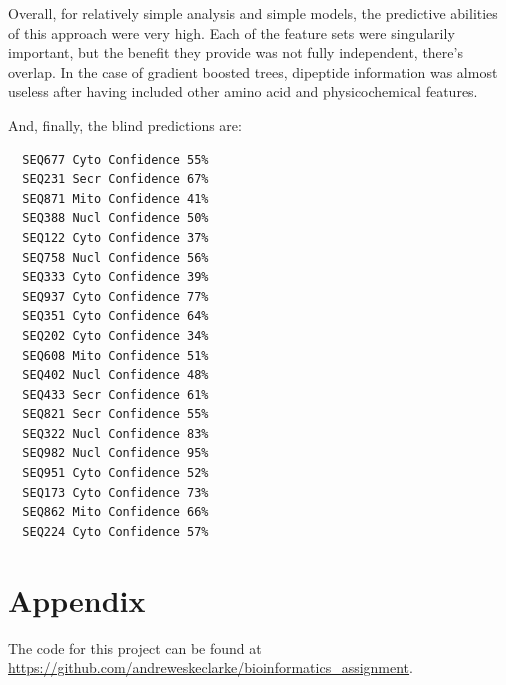 \documentclass{bioinfo}
\begin{document}
Overall, for relatively simple analysis and simple models, the predictive abilities of this approach were very high.
Each of the feature sets were singularily important, but the benefit they provide was not fully independent, there's overlap.
In the case of gradient boosted trees, dipeptide information was almost useless after having included other amino acid and physicochemical features.

And, finally, the blind predictions are:
\begin{lstlisting}
  SEQ677 Cyto Confidence 55% 
  SEQ231 Secr Confidence 67% 
  SEQ871 Mito Confidence 41% 
  SEQ388 Nucl Confidence 50% 
  SEQ122 Cyto Confidence 37% 
  SEQ758 Nucl Confidence 56% 
  SEQ333 Cyto Confidence 39% 
  SEQ937 Cyto Confidence 77% 
  SEQ351 Cyto Confidence 64% 
  SEQ202 Cyto Confidence 34% 
  SEQ608 Mito Confidence 51% 
  SEQ402 Nucl Confidence 48% 
  SEQ433 Secr Confidence 61% 
  SEQ821 Secr Confidence 55% 
  SEQ322 Nucl Confidence 83% 
  SEQ982 Nucl Confidence 95% 
  SEQ951 Cyto Confidence 52% 
  SEQ173 Cyto Confidence 73% 
  SEQ862 Mito Confidence 66% 
  SEQ224 Cyto Confidence 57% 
\end{lstlisting}



\section{Appendix}

The code for this project can be found at \url{https://github.com/andreweskeclarke/bioinformatics_assignment}.
\end{document}
